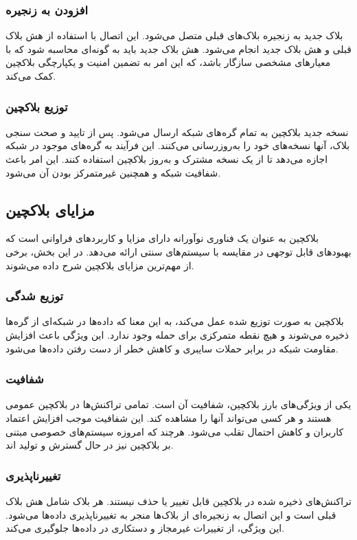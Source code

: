 \subsubsection{افزودن به زنجیره}
بلاک جدید به زنجیره بلاک‌های قبلی متصل می‌شود. این اتصال با استفاده از هش بلاک قبلی و هش بلاک جدید انجام می‌شود. هش بلاک جدید باید به گونه‌ای محاسبه شود که با معیارهای مشخصی سازگار باشد، که این امر به تضمین امنیت و یکپارچگی بلاکچین کمک می‌کند.

\subsubsection{توزیع بلاکچین}
نسخه جدید بلاکچین به تمام گره‌های شبکه ارسال می‌شود. پس از تایید و صحت سنجی بلاک، آنها نسخه‌های خود را به‌روزرسانی می‌کنند. این فرآیند به گره‌های موجود در شبکه اجازه می‌دهد تا از یک نسخه مشترک و به‌روز بلاکچین استفاده کنند. این امر باعث شفافیت شبکه و همچنین غیرمتمرکز بودن آن می‌شود.

\subsection{مزایای بلاکچین}

بلاکچین به عنوان یک فناوری نوآورانه دارای مزایا و کاربردهای فراوانی است که بهبودهای قابل توجهی در مقایسه با سیستم‌های سنتی ارائه می‌دهد. در این بخش، برخی از مهم‌ترین مزایای بلاکچین شرح داده می‌شوند.

\subsubsection{توزیع شدگی}
بلاکچین به صورت توزیع شده عمل می‌کند، به این معنا که داده‌ها در شبکه‌ای از گره‌ها ذخیره می‌شوند و هیچ نقطه متمرکزی برای حمله وجود ندارد. این ویژگی باعث افزایش مقاومت شبکه در برابر حملات سایبری و کاهش خطر از دست رفتن داده‌ها می‌شود.

\subsubsection{شفافیت}
یکی از ویژگی‌های بارز بلاکچین، شفافیت آن است. تمامی تراکنش‌ها در بلاکچین عمومی هستند و هر کسی می‌تواند آنها را مشاهده کند. این شفافیت موجب افزایش اعتماد کاربران و کاهش احتمال تقلب می‌شود.
هرچند که امروزه سیستم‌های خصوصی مبتنی بر بلاکچین نیز در حال گسترش و تولید اند.

\subsubsection{تغییرناپذیری}
تراکنش‌های ذخیره شده در بلاکچین قابل تغییر یا حذف نیستند. هر بلاک شامل هش بلاک قبلی است و این اتصال به زنجیره‌ای از بلاک‌ها منجر به تغییرناپذیری داده‌ها می‌شود. این ویژگی، از تغییرات غیرمجاز و دستکاری در داده‌ها جلوگیری می‌کند.


